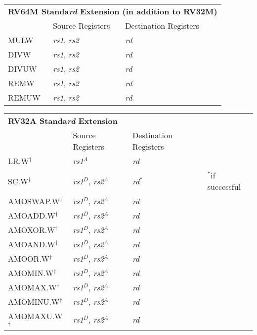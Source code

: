 \begin{tabular}{p{25mm}|p{3cm}|p{6cm}|p{10cm}}
  \multicolumn{4}{l}{\bf RV64M Standa{\em rd} Extension (in addition to RV32M)} \\
  \cline{2-3}
   & Source Registers & Destination Registers \\
  \cline{2-3}
   MULW & {\em rs1}, {\em rs2} & {\em rd} &  \\
   \cline{2-3}
   DIVW & {\em rs1}, {\em rs2} & {\em rd} &  \\
   \cline{2-3}
   DIVUW & {\em rs1}, {\em rs2} & {\em rd} &  \\
   \cline{2-3}
   REMW & {\em rs1}, {\em rs2} & {\em rd} &  \\
   \cline{2-3}
   REMUW & {\em rs1}, {\em rs2} & {\em rd} &  \\
   \cline{2-3}
\end{tabular}

\begin{tabular}{p{25mm}|p{3cm}|p{6cm}|p{10cm}}
  \multicolumn{4}{l}{\bf RV32A Standa{\em rd} Extension} \\
  \cline{2-3}
   & Source Registers & Destination Registers \\
  \cline{2-3}
   LR.W$^\dagger$ & {\em rs1}$^A$ & {\em rd} &  \\
   \cline{2-3}
   SC.W$^\dagger$ & {\em rs1}$^D$, {\em rs2}$^A$ & {\em rd}$^*$ & $^*$if successful \\
   \cline{2-3}
   AMOSWAP.W$^\dagger$ & {\em rs1}$^D$, {\em rs2}$^A$ & {\em rd} &  \\
   \cline{2-3}
   AMOADD.W$^\dagger$ & {\em rs1}$^D$, {\em rs2}$^A$ & {\em rd} &  \\
   \cline{2-3}
   AMOXOR.W$^\dagger$ & {\em rs1}$^D$, {\em rs2}$^A$ & {\em rd} &  \\
   \cline{2-3}
   AMOAND.W$^\dagger$ & {\em rs1}$^D$, {\em rs2}$^A$ & {\em rd} &  \\
   \cline{2-3}
   AMOOR.W$^\dagger$ & {\em rs1}$^D$, {\em rs2}$^A$ & {\em rd} &  \\
   \cline{2-3}
   AMOMIN.W$^\dagger$ & {\em rs1}$^D$, {\em rs2}$^A$ & {\em rd} &  \\
   \cline{2-3}
   AMOMAX.W$^\dagger$ & {\em rs1}$^D$, {\em rs2}$^A$ & {\em rd} &  \\
   \cline{2-3}
   AMOMINU.W$^\dagger$ & {\em rs1}$^D$, {\em rs2}$^A$ & {\em rd} &  \\
   \cline{2-3}
   AMOMAXU.W$^\dagger$ & {\em rs1}$^D$, {\em rs2}$^A$ & {\em rd} &  \\
   \cline{2-3}
\end{tabular}

